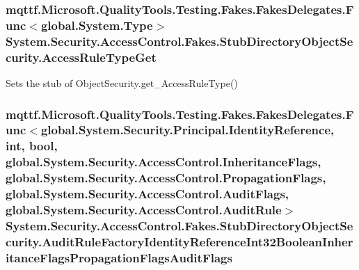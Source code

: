 \hypertarget{class_system_1_1_security_1_1_access_control_1_1_fakes_1_1_stub_directory_object_security_a543d769371a377b8231414e80262921c}{
\subsubsection[{Access\-Rule\-Type\-Get}]{\setlength{\rightskip}{0pt plus 5cm}mqttf.\-Microsoft.\-Quality\-Tools.\-Testing.\-Fakes.\-Fakes\-Delegates.\-Func$<$global.\-System.\-Type$>$ System.\-Security.\-Access\-Control.\-Fakes.\-Stub\-Directory\-Object\-Security.\-Access\-Rule\-Type\-Get}}\label{class_system_1_1_security_1_1_access_control_1_1_fakes_1_1_stub_directory_object_security_a543d769371a377b8231414e80262921c}


Sets the stub of Object\-Security.\-get\-\_\-\-Access\-Rule\-Type()

\hypertarget{class_system_1_1_security_1_1_access_control_1_1_fakes_1_1_stub_directory_object_security_a45ec73a0fc9a54bb1504fcc8ae761945}{
\subsubsection[{Audit\-Rule\-Factory\-Identity\-Reference\-Int32\-Boolean\-Inheritance\-Flags\-Propagation\-Flags\-Audit\-Flags}]{\setlength{\rightskip}{0pt plus 5cm}mqttf.\-Microsoft.\-Quality\-Tools.\-Testing.\-Fakes.\-Fakes\-Delegates.\-Func$<$global.\-System.\-Security.\-Principal.\-Identity\-Reference, int, bool, global.\-System.\-Security.\-Access\-Control.\-Inheritance\-Flags, global.\-System.\-Security.\-Access\-Control.\-Propagation\-Flags, global.\-System.\-Security.\-Access\-Control.\-Audit\-Flags, global.\-System.\-Security.\-Access\-Control.\-Audit\-Rule$>$ System.\-Security.\-Access\-Control.\-Fakes.\-Stub\-Directory\-Object\-Security.\-Audit\-Rule\-Factory\-Identity\-Reference\-Int32\-Boolean\-Inheritance\-Flags\-Propagation\-Flags\-Audit\-Flags}}\label{class_system_1_1_security_1_1_access_control_1_1_fakes_1_1_stub_directory_object_security_a45ec73a0fc9a54bb1504fcc8ae761945}


